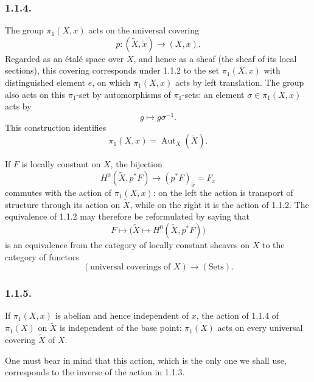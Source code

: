 \subsubsection*{1.1.4.}
The group $\pi_1(X,x)$ acts on the universal covering
\[
p:(\widetilde X,\widetilde x)\longrightarrow(X,x).
\]
Regarded as an \'etal\'e space over $X$, and hence as a sheaf (the
sheaf of its local sections), this covering corresponds under 1.1.2
to the set $\pi_1(X,x)$ with distinguished element $e$, on which
$\pi_1(X,x)$ acts by left translation.  The group also acts on this
$\pi_1$-set by automorphisms of $\pi_1$-sets: an element
$\sigma\in\pi_1(X,x)$ acts by
\[
g\longmapsto g\sigma^{-1}.
\]
This construction identifies
\[
\pi_1(X,x)=\operatorname{Aut}_X(\widetilde X).
\]

If $F$ is locally constant on $X$, the bijection
\begin{equation}\tag{1.1.4.1}
H^0(\widetilde X,p^*F)
\longrightarrow(p^*F)_{\widetilde x}=F_x
\end{equation}
commutes with the action of $\pi_1(X,x)$: on the left the action is
transport of structure through its action on $\widetilde X$, while on
the right it is the action of 1.1.2.  The equivalence of 1.1.2 may
therefore be reformulated by saying that
\[
F\longmapsto
\bigl(\widetilde X\longmapsto
H^0(\widetilde X,p^*F)\bigr)
\]
is an equivalence from the category of locally constant sheaves on
$X$ to the category of functors
\[
(\text{universal coverings of }X)\longrightarrow(\mathrm{Sets}).
\]

\subsubsection*{1.1.5.}
If $\pi_1(X,x)$ is abelian and hence independent of $x$, the action
of 1.1.4 of $\pi_1(X)$ on $\widetilde X$ is independent of the base
point: $\pi_1(X)$ acts on every universal covering $\widetilde X$ of
$X$.

One must bear in mind that this action, which is the only one we shall
use, corresponds to the inverse of the action in 1.1.3.
